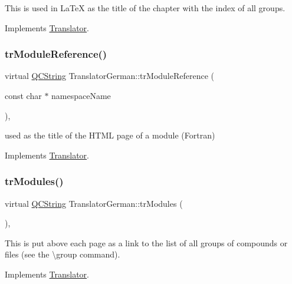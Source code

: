 This is used in La\+TeX as the title of the chapter with the index of all groups. 

Implements \mbox{\hyperlink{class_translator}{Translator}}.

\mbox{\label{class_translator_german_ae0c777571dbb29c718edc0502793f963}} 
\subsubsection{\texorpdfstring{trModuleReference()}{trModuleReference()}}
{\footnotesize\ttfamily virtual \mbox{\hyperlink{class_q_c_string}{Q\+C\+String}} Translator\+German\+::tr\+Module\+Reference (\begin{DoxyParamCaption}\item[{const char $\ast$}]{namespace\+Name }\end{DoxyParamCaption})\hspace{0.3cm}{\ttfamily [inline]}, {\ttfamily [virtual]}}

used as the title of the H\+T\+ML page of a module (Fortran) 

Implements \mbox{\hyperlink{class_translator}{Translator}}.

\mbox{\label{class_translator_german_a9b988ee88b74fe4c45556d2341aa13f8}} 
\subsubsection{\texorpdfstring{trModules()}{trModules()}}
{\footnotesize\ttfamily virtual \mbox{\hyperlink{class_q_c_string}{Q\+C\+String}} Translator\+German\+::tr\+Modules (\begin{DoxyParamCaption}{ }\end{DoxyParamCaption})\hspace{0.3cm}{\ttfamily [inline]}, {\ttfamily [virtual]}}

This is put above each page as a link to the list of all groups of compounds or files (see the \textbackslash{}group command). 

Implements \mbox{\hyperlink{class_translator}{Translator}}.

